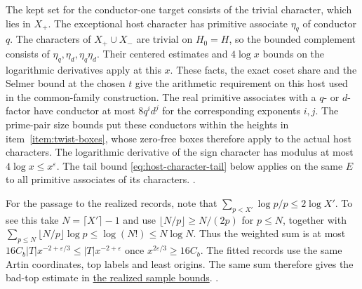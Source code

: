 The kept set for the conductor-one target consists of the trivial
character, which lies in \(X_+\). The exceptional host character
has primitive associate \(\eta_q\) of conductor \(q\). The characters
of \(X_+\cup X_-\) are trivial on \(H_0=H\), so the bounded
complement consists of \(\eta_q,\eta_d,\eta_q\eta_d\).
Their centered estimates and \(4\log x\) bounds on the logarithmic
derivatives apply at this \(x\). These facts, the exact coset share
and the Selmer bound at the chosen \(t\) give the arithmetic
requirement on this host used in the common-family construction.
The real primitive associates with a \(q\)- or \(d\)-factor have
conductor at most \(8q^i d^j\) for the corresponding exponents \(i,j\).
The prime-pair size bounds put these conductors within the heights
in item~\ref{item:twist-boxes}, whose zero-free boxes therefore apply
to the actual host characters. The logarithmic derivative of the
sign character has modulus at most \(4\log x\le x^\varepsilon\).
The tail bound \eqref{eq:host-character-tail} below applies on the
same \(E\) to all primitive associates of its characters.
.

For the passage to the realized records, note that
\(\sum_{p<X'}\log p/p\le2\log X'\). To see this take
\(N=\lceil X'\rceil-1\) and use
\(\lfloor N/p\rfloor\ge N/(2p)\) for \(p\le N\), together with
\(\sum_{p\le N}\lfloor N/p\rfloor\log p\le\log(N!)\le N\log N\).
Thus the weighted sum is at most
\(16C_b|T|x^{-2+\varepsilon/3}\le|T|x^{-2+\varepsilon}\)
once \(x^{2\varepsilon/3}\ge16C_b\). The fitted records
use the same Artin coordinates, top labels and least origins.
The same sum therefore gives the bad-top estimate in
\hyperlink{proof.selection-realized-samples}{the realized sample bounds}.
.

